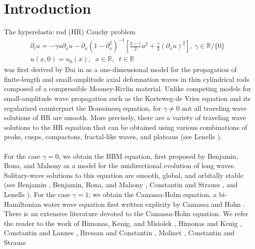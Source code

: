 \documentclass[12pt,reqno]{amsart}
\numberwithin{equation}{section}  %
\numberwithin{figure}{section}
\newcommand{\rr}{\mathbb{R}}
\newcommand{\p}{\partial}
\begin{document}
        \section{Introduction}
%
%
%
The hyperelastic rod (HR) Cauchy problem
\begin{gather}
 \p_t u =  -\gamma u \p_x u -
 \p_{x} (1 - \p_{x}^{2})^{-1} \left[ \frac{3-\gamma}{2}u^2 +
\frac{\gamma}{2} \left( \p_x u \right)^2
\right], \ \gamma \in \rr \slash \{0\}
\label{hyperelastic-rod-equation}
\\
 u(x,0) = u_0(x), \; \; x \in \rr, \; \; t \in \rr
\label{init-cond}
\end{gather}
%
%
was first
derived by Dai in \cite{Dai_1998_Model-equations} as a one-dimensional 
model for the propagation of finite-length and
small-amplitude axial deformation waves in thin cylindrical
rods composed of a compressible Mooney-Rivlin
material. Unlike competing models for small-amplitude wave propagation such as
the Korteweg-de Vries equation and its regularized counterpart the Boussinesq equation, for $\gamma \neq 0$ not all traveling wave solutions of HR are smooth. More precisely, there are a variety of traveling wave solutions to the HR equation that
can be obtained using various combinations of peaks, cusps, compactons,
fractal-like waves, and plateaus (see Lenells 
\cite{Lenells_2006_Traveling-waves}). 
\\
\\
For the case $\gamma = 0$, we obtain the 
BBM equation, first proposed by 
Benjamin, Bona, and Mahony 
\cite{Benjamin_1972_Model-equations} as a model for 
the unidirectional evolution of long waves.
Solitary-wave solutions to this 
equation are smooth, global, and orbitally stable (see Benjamin 
\cite{Benjamin_1972_The-stability-o}, Benjamin, Bona, and Mahony
\cite{Benjamin_1972_Model-equations}, Constantin and Strauss
\cite{Constantin_2000_Stability-of-a-}, and Lenells
\cite{Lenells_2006_Traveling-waves}). For the case $\gamma =1$, we obtain the Camassa-Holm equation, a bi-Hamiltonian
water wave equation first written explicity by Camassa and Holm
\cite{Camassa-Holm-1993-An-integrable-shallow-water}. There is an extensive
literature devoted to the Camassa-Holm equation. We refer the reader to the work
of Himonas, Kenig, and Misiolek \cite{Himonas:2010p1187}, Himonas and Kenig
\cite{Himonas:2009fk}, Constantin and Lannes
\cite{Constantin-Lannes-2009-The-hydrodynamical-relevance-of-the-Camassa-Holm},
Bressan and Constantin \cite{Bressan_2007_Global-conserva}, 
Molinet \cite{Molinet_2004_On-well-posedne}, Constantin and Strauss
\end{document}
